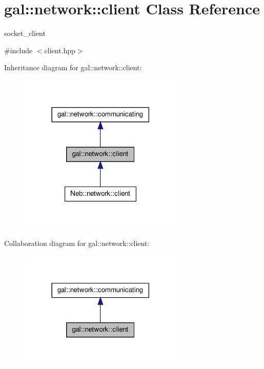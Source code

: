 \hypertarget{classgal_1_1network_1_1client}{\section{gal\-:\-:network\-:\-:client \-Class \-Reference}
\label{classgal_1_1network_1_1client}
}


socket\-\_\-client  




{\ttfamily \#include $<$client.\-hpp$>$}



\-Inheritance diagram for gal\-:\-:network\-:\-:client\-:\nopagebreak
\begin{figure}[H]
\begin{center}
\leavevmode
\includegraphics[width=222pt]{classgal_1_1network_1_1client__inherit__graph}
\end{center}
\end{figure}


\-Collaboration diagram for gal\-:\-:network\-:\-:client\-:\nopagebreak
\begin{figure}[H]
\begin{center}
\leavevmode
\includegraphics[width=222pt]{classgal_1_1network_1_1client__coll__graph}
\end{center}
\end{figure}
